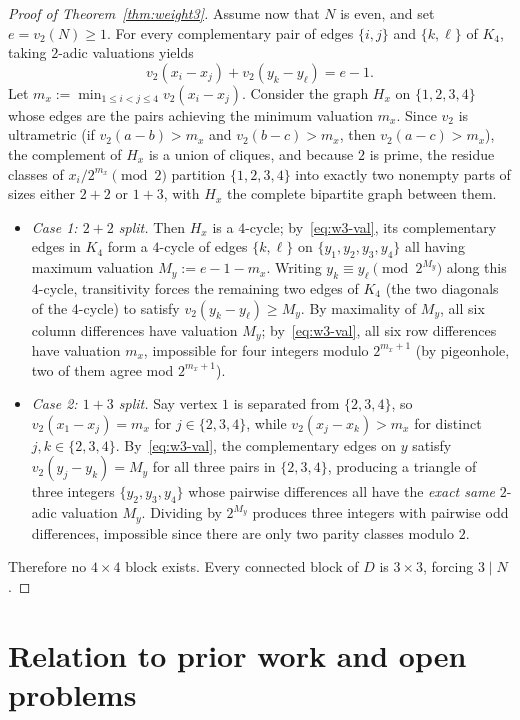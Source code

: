 \documentclass[11pt,reqno]{amsart}
\numberwithin{equation}{section}
\theoremstyle{definition}
\theoremstyle{remark}
\begin{document}
\begin{proof}[Proof of Theorem~\ref{thm:weight3}]
Assume now that $N$ is even, and set $e = v_2(N)\ge 1$. For every complementary pair of edges $\{i,j\}$ and $\{k,\ell\}$ of $K_4$, taking $2$-adic valuations yields
\begin{equation}
\label{eq:w3-val}
v_2(x_i-x_j) + v_2(y_k-y_\ell) = e - 1.
\end{equation}
Let $m_x := \min_{1\le i<j\le 4} v_2(x_i-x_j)$. Consider the graph $H_x$ on $\{1,2,3,4\}$ whose edges are the pairs achieving the minimum valuation $m_x$. Since $v_2$ is ultrametric (if $v_2(a-b)>m_x$ and $v_2(b-c)>m_x$, then $v_2(a-c)>m_x$), the complement of $H_x$ is a union of cliques, and because $2$ is prime, the residue classes of $x_i/2^{m_x}\pmod 2$ partition $\{1,2,3,4\}$ into exactly two nonempty parts of sizes either $2+2$ or $1+3$, with $H_x$ the complete bipartite graph between them.
\begin{itemize}[leftmargin=1.5em]
\item \emph{Case 1: $2+2$ split.} Then $H_x$ is a $4$-cycle; by~\eqref{eq:w3-val}, its complementary edges in $K_4$ form a $4$-cycle of edges $\{k,\ell\}$ on $\{y_1,y_2,y_3,y_4\}$ all having maximum valuation $M_y := e-1-m_x$. Writing $y_k \equiv y_\ell \pmod{2^{M_y}}$ along this $4$-cycle, transitivity forces the remaining two edges of $K_4$ (the two diagonals of the $4$-cycle) to satisfy $v_2(y_k-y_\ell)\ge M_y$. By maximality of $M_y$, all six column differences have valuation $M_y$; by~\eqref{eq:w3-val}, all six row differences have valuation $m_x$, impossible for four integers modulo $2^{m_x+1}$ (by pigeonhole, two of them agree mod $2^{m_x+1}$).
\item \emph{Case 2: $1+3$ split.} Say vertex $1$ is separated from $\{2,3,4\}$, so $v_2(x_1-x_j)=m_x$ for $j\in\{2,3,4\}$, while $v_2(x_j-x_k) > m_x$ for distinct $j,k\in\{2,3,4\}$. By~\eqref{eq:w3-val}, the complementary edges on $y$ satisfy $v_2(y_j-y_k) = M_y$ for all three pairs in $\{2,3,4\}$, producing a triangle of three integers $\{y_2,y_3,y_4\}$ whose pairwise differences all have the \emph{exact same} $2$-adic valuation $M_y$. Dividing by $2^{M_y}$ produces three integers with pairwise odd differences, impossible since there are only two parity classes modulo $2$.
\end{itemize}
Therefore no $4\times 4$ block exists. Every connected block of $D$ is $3\times 3$, forcing $3\mid N$.
\end{proof}

\section{Relation to prior work and open problems}
\label{sec:discussion}
\end{document}
